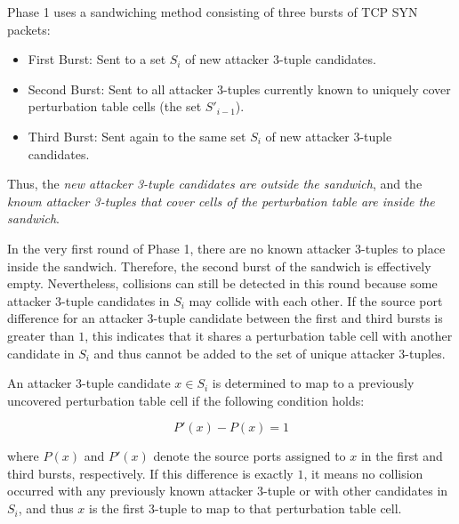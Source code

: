 \documentclass{report}
\begin{document}

Phase 1 uses a \alert{sandwiching method} consisting of three bursts of TCP SYN packets:

\begin{itemize}
	\item \alert{First Burst:} Sent to a set $S_i$ of new attacker 3-tuple candidates.
	\item \alert{Second Burst:} Sent to all attacker 3-tuples currently known to uniquely cover perturbation table cells (the set $S'_{i-1}$).
	\item \alert{Third Burst:} Sent again to the same set $S_i$ of new attacker 3-tuple candidates.
\end{itemize}

Thus, the \emph{new attacker 3-tuple candidates are outside the sandwich}, and the \emph{known attacker 3-tuples that cover cells of the perturbation table are inside the sandwich}.


In the very first round of Phase 1, there are no known attacker 3-tuples to place inside the sandwich. Therefore, the second burst of the sandwich is effectively empty. Nevertheless, collisions can still be detected in this round because some attacker 3-tuple candidates in $S_i$ may collide with each other. If the source port difference for an attacker 3-tuple candidate between the first and third bursts is greater than $1$, this indicates that it shares a perturbation table cell with another candidate in $S_i$ and thus cannot be added to the set of unique attacker 3-tuples.


An attacker 3-tuple candidate $x \in S_i$ is determined to map to a previously uncovered perturbation table cell if the following condition holds:

\[
	P'(x) - P(x) = 1
\]

where $P(x)$ and $P'(x)$ denote the source ports assigned to $x$ in the first and third bursts, respectively. If this difference is exactly $1$, it means no collision occurred with any previously known attacker 3-tuple or with other candidates in $S_i$, and thus $x$ is the first 3-tuple to map to that perturbation table cell.
\end{document}
